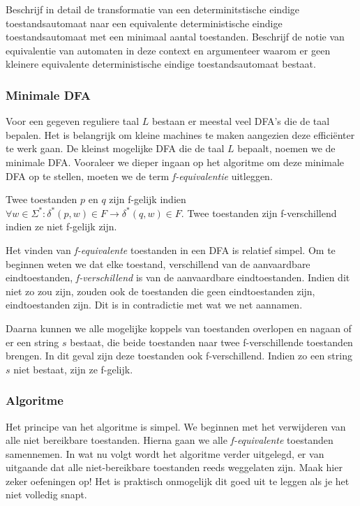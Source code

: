 \begin{quest}[Vraag 1]
Beschrijf in detail de transformatie van een determinitstische eindige toestandsautomaat naar een equivalente deterministische eindige toestandsautomaat met een minimaal aantal toestanden. Beschrijf de notie van equivalentie van automaten in deze context en argumenteer waarom er geen kleinere equivalente deterministische eindige toestandsautomaat bestaat.
\end{quest}

\subsubsection*{Minimale DFA}

Voor een gegeven reguliere taal $L$ bestaan er meestal veel DFA's die de taal bepalen. Het is belangrijk om kleine machines te maken aangezien deze effici\"enter te werk gaan. De kleinst mogelijke DFA die de taal $L$ bepaalt, noemen we de minimale DFA. Vooraleer we dieper ingaan op het algoritme om deze minimale DFA op te stellen, moeten we de term \textit{f-equivalentie} uitleggen.

\begin{theorem}[f-equivalentie]
	Twee toestanden $p$ en $q$ zijn f-gelijk indien $\forall w \in \Sigma^*:\delta^*(p,w) \in F \rightarrow \delta^*(q,w) \in F$. Twee toestanden zijn f-verschillend indien ze niet f-gelijk zijn.
\end{theorem}

Het vinden van \textit{f-equivalente} toestanden in een DFA is relatief simpel. Om te beginnen weten we dat elke toestand, verschillend van de aanvaardbare eindtoestanden, \textit{f-verschillend} is van de aanvaardbare eindtoestanden. Indien dit niet zo zou zijn, zouden ook de toestanden die geen eindtoestanden zijn, eindtoestanden zijn. Dit is in contradictie met wat we net aannamen.

Daarna kunnen we alle mogelijke koppels van toestanden overlopen en nagaan of er een string $s$ bestaat, die beide toestanden naar twee f-verschillende toestanden brengen. In dit geval zijn deze toestanden ook f-verschillend. Indien zo een string $s$ niet bestaat, zijn ze f-gelijk.

\subsubsection*{Algoritme}

Het principe van het algoritme is simpel. We beginnen met het verwijderen van alle niet bereikbare toestanden. Hierna gaan we alle \textit{f-equivalente} toestanden samennemen. In wat nu volgt wordt het algoritme verder uitgelegd, er van uitgaande dat alle niet-bereikbare toestanden reeds weggelaten zijn. Maak hier zeker oefeningen op! Het is praktisch onmogelijk dit goed uit te leggen als je het niet volledig snapt.

